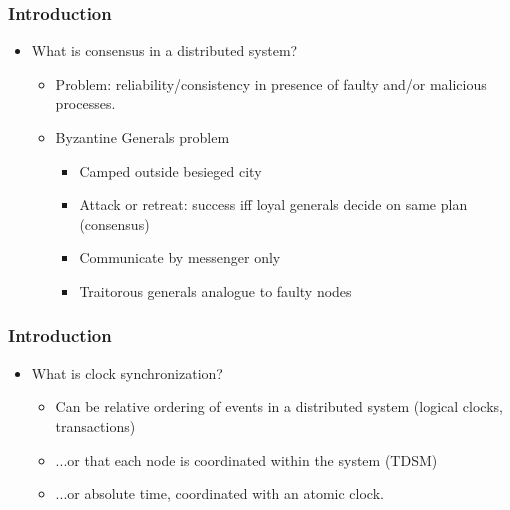 \documentclass{beamer}
\begin{document}
\begin{frame}
  \frametitle{Introduction}
  \begin{itemize}
  \item<1-> What is consensus in a distributed system?
    \begin{itemize}
    \item<2-> Problem: reliability/consistency in presence of faulty
      and/or malicious processes.
    \item<3-> Byzantine Generals problem
      \begin{itemize}
      \item<4-> Camped outside besieged city
      \item<5-> Attack or retreat: success iff loyal generals decide on same plan (consensus)
      \item<6-> Communicate by messenger only
      \item<7-> Traitorous generals analogue to faulty nodes
      \end{itemize}
    \end{itemize}
  \end{itemize}
\end{frame}

\begin{frame}
  \frametitle{Introduction}
  \begin{itemize}
  \item<1-> What is clock synchronization?
    \begin{itemize}
s    \item<2-> Can be relative ordering of events in a distributed system
      (logical clocks, transactions)
    \item<3-> ...or that each node is coordinated within the system (TDSM)
    \item<4-> ...or absolute time, coordinated with an atomic clock.
    \end{itemize}
  \end{itemize}
\end{frame}
\end{document}

